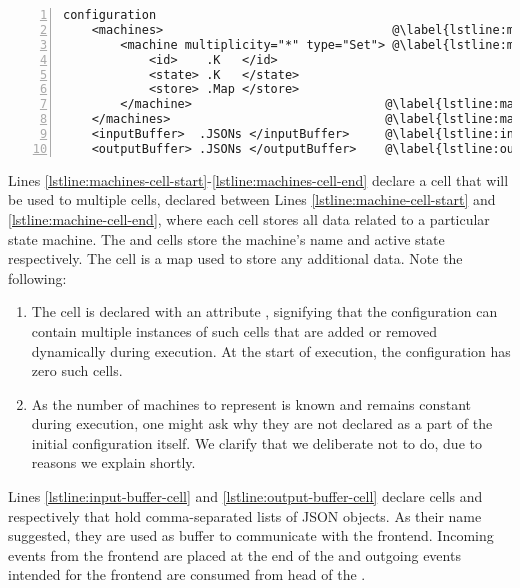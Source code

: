 \begin{lstlisting}[float=ht,
  frame=single,
  style=ksty,
  language=k,
  numbers=left,
  numbersep=5pt,
  caption={Initial Configuration},
  label={lst:initial-configuration},
  xleftmargin=3ex
]
configuration
    <machines>                                @\label{lstline:machines-cell-start}@
        <machine multiplicity="*" type="Set"> @\label{lstline:machine-cell-start}@
            <id>    .K   </id>
            <state> .K   </state>
            <store> .Map </store>
        </machine>                           @\label{lstline:machine-cell-end}@
    </machines>                              @\label{lstline:machines-cell-end}@
    <inputBuffer>  .JSONs </inputBuffer>     @\label{lstline:input-buffer-cell}@
    <outputBuffer> .JSONs </outputBuffer>    @\label{lstline:output-buffer-cell}@
\end{lstlisting}

Lines \ref{lstline:machines-cell-start}-\ref{lstline:machines-cell-end} declare
a cell  that will be used to multiple
 cells, declared between Lines
\ref{lstline:machine-cell-start} and \ref{lstline:machine-cell-end}, where
each cell stores all data related to a particular state machine. The
 and  cells store the machine's name and
active state respectively. The  cell
is a map used to store any additional data. Note the following:
\begin{enumerate}[label=(\roman*)]
  \item The  cell is declared with an attribute
    , signifying that the configuration can contain
    multiple instances of such cells that are added or removed dynamically
    during execution. At the start of execution, the configuration has
    zero such cells.
  \item As the number of machines to represent is known and remains constant
    during execution, one might ask why they are not declared as a part of the
    initial configuration itself. We clarify that we deliberate not to do, due
    to reasons we explain shortly.
\end{enumerate}

Lines \ref{lstline:input-buffer-cell} and \ref{lstline:output-buffer-cell}
declare cells  and  respectively
that hold comma-separated lists of
JSON objects. As their name suggested, they are used as buffer to communicate with
the frontend. Incoming events from the
frontend are placed at the end of the  and outgoing
events intended for the frontend are consumed from head of the .

